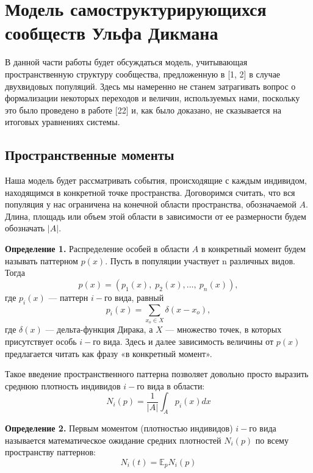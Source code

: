 \chapter{Модель самоструктурирующихся сообществ Ульфа Дикмана}

В данной части работы будет обсуждаться модель, учитывающая пространственную структуру сообщества, предложенную в [1, 2] в случае двухвидовых популяций. Здесь мы намеренно не станем затрагивать вопрос о формализации некоторых переходов и величин, используемых нами, поскольку это было проведено в работе [22] и, как было доказано, не сказывается на итоговых уравнениях системы.

\section{Пространственные моменты}

Наша модель будет рассматривать события, происходящие с каждым индивидом, находящимся в конкретной точке пространства. Договоримся считать, что вся популяция у нас ограничена на конечной области пространства, обозначаемой $ A $. Длина, площадь или объем этой области в зависимости от ее размерности будем обозначать $ |A| $.

\textbf{Определение 1.} Распределение особей в области $ A $ в конкретный момент будем называть паттерном $ p(x) $. Пусть в популяции участвует n различных видов. Тогда  \begin{equation*}
p(x)=\left(p_{1}(x),\;p_{2}(x),\ldots,\:p_{n}(x)\right), 
\end{equation*}
где $ p_{i}(x) $ --- паттерн $ i- $го вида, равный
\begin{equation*}
p_{i}(x)=\sum_{x_{o}\in X}\delta(x-x_{o}),
\end{equation*}
где $ \delta(x) $ --- дельта-функция Дирака, а $ X $ --- множество точек, в которых присутствует особь $ i- $го вида. Здесь и далее зависимость величины от $ p(x) $ предлагается читать как фразу «в конкретный момент».

Такое введение пространственного паттерна позволяет довольно просто выразить среднюю плотность индивидов $ i- $го вида в области:
\begin{equation*}
N_{i}(p)=\frac{1}{|A|}\int_{A}p_{i}(x)dx
\end{equation*}

\textbf{Определение 2.} Первым моментом (плотностью индивидов) $ i- $го вида называется математическое ожидание средних плотностей $ N_{i}(p) $ по всему пространству паттернов:
\begin{equation*}
N_{i}(t)=\mathbb{E}_{p}N_{i}(p)
\end{equation*}

